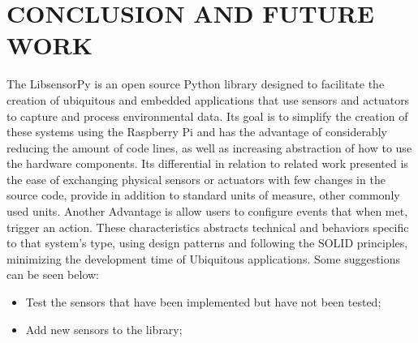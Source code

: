 \documentclass{acm_proc_article-sp}
\begin{document}
\section{CONCLUSION AND FUTURE WORK}
\label{sec:conclusion}
The LibsensorPy is an open source Python library designed to facilitate the creation of ubiquitous and embedded applications that use sensors and actuators to capture and process environmental data.
\newline
\newline
Its goal is to simplify the creation of these systems using the Raspberry Pi and has the advantage of considerably reducing the amount of code lines, as well as increasing abstraction of how to use the hardware components.
\newline
\newline
Its differential in relation to related work presented is the ease of exchanging physical sensors or actuators with few changes in the source code, provide in addition to standard units of measure, other commonly used units. Another Advantage is allow users to configure events that when met, trigger an action.
\newline
\newline
These characteristics abstracts technical and behaviors specific to that system's type, using design patterns and following the SOLID principles, minimizing the development time of Ubiquitous applications.
\newline
\newline
Some suggestions can be seen below:
\begin{itemize}
\item Test the sensors that have been implemented but have not been tested;
\item Add new sensors to the library;

\end{itemize}



\appendix

\end{document}
